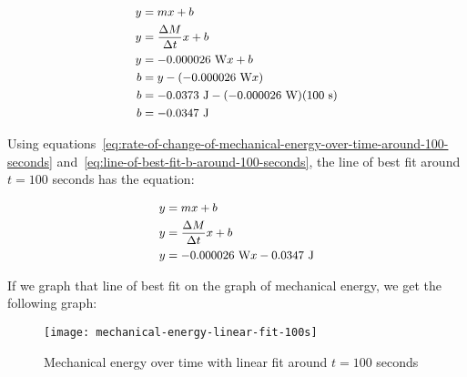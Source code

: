 \documentclass[titlepage]{article}
\begin{document}
            \begin{equation}
                \small
                \begin{aligned}
                    y &= mx + b \\
                    y &= \frac{\Delta M}{\Delta t}x + b \\
                    y &= -0.000026 \text{ W}x + b \\
                    b &= y - (-0.000026 \text{ W}x)\\
                    b &= -0.0373 \text{ J} - (-0.000026 \text{ W})(100 \text{ s}) \\
                    b &= -0.0347 \text{ J} \\
                \end{aligned}\label{eq:line-of-best-fit-b-around-100-seconds}
            \end{equation}
            
            Using equations~\ref{eq:rate-of-change-of-mechanical-energy-over-time-around-100-seconds} and~\ref{eq:line-of-best-fit-b-around-100-seconds}, the line of best fit around $t=100$ seconds has the equation:
            
            \begin{equation}
                \small
                \begin{aligned}
                    y &= mx + b \\
                    y &= \frac{\Delta M}{\Delta t}x + b \\
                    y &= -0.000026 \text{ W}x - 0.0347 \text{ J} \\
                \end{aligned}\label{eq:line-of-best-fit-equation-around-100-seconds}
            \end{equation}
            
            If we graph that line of best fit on the graph of mechanical energy, we get the following graph:
            
            \begin{figure}[H]
                \centering
                \texttt{[image: mechanical-energy-linear-fit-100s]}
                \caption{Mechanical energy over time with linear fit around $t=100$ seconds}
                \label{fig:mechanical-energy-linear-fit-100s}
            \end{figure}
            
\end{document}
